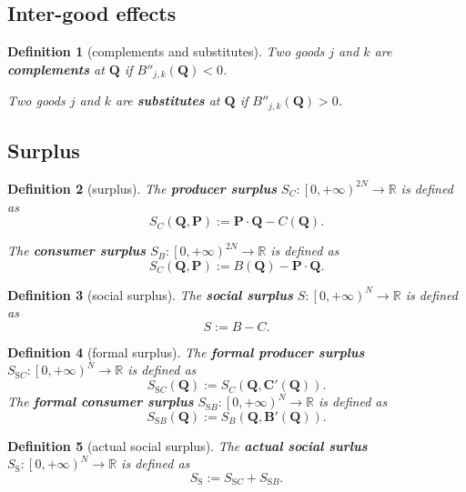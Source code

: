 \documentclass{article}
\newtheorem{definition}{Definition}[subsection]
\begin{document}
\subsection{Inter-good effects}

\begin{definition}[complements and substitutes]
Two goods $j$ and $k$ are \textbf{complements} at $\mathbf Q$ if $B''_{j,k}\left(\mathbf Q\right)<0$.

Two goods $j$ and $k$ are \textbf{substitutes} at $\mathbf Q$ if $B''_{j,k}\left(\mathbf Q\right)>0$.
\end{definition}

\subsection{Surplus}

\begin{definition}[surplus]
\label{multi surplus}
The \textbf{producer surplus} $S_C:\left[0,+\infty\right)^{2N}\to\mathbb R$ is defined as
$$S_C\left(\mathbf Q,\mathbf P\right):=\mathbf P\cdot\mathbf Q-C\left(\mathbf Q\right).$$

The \textbf{consumer surplus} $S_B:\left[0,+\infty\right)^{2N}\to\mathbb R$ is defined as
$$S_C\left(\mathbf Q,\mathbf P\right):=B\left(\mathbf Q\right)-\mathbf P\cdot\mathbf Q.$$
\end{definition}

\begin{definition}[social surplus]
\label{multi social surplus}
The \textbf{social surplus} $S:\left[0,+\infty\right)^N\to\mathbb R$ is defined as
$$S:=B-C.$$
\end{definition}

\begin{definition}[formal surplus]
\label{multi formal surplus}
The \textbf{formal producer surplus} $S_{\mathrm SC}:\left[0,+\infty\right)^N\to\mathbb R$ is defined as
$$S_{\mathrm SC}\left(\mathbf Q\right):=S_C\left(\mathbf Q,\mathbf C'\left(\mathbf Q\right)\right).$$
The \textbf{formal consumer surplus} $S_{\mathrm SB}:\left[0,+\infty\right)^N\to\mathbb R$ is defined as
$$S_{\mathrm SB}\left(\mathbf Q\right):=S_B\left(\mathbf Q,\mathbf B'\left(\mathbf Q\right)\right).$$
\end{definition}

\begin{definition}[actual social surplus]
\label{multi actual social surplus}
The \textbf{actual social surlus} $S_\mathrm S:\left[0,+\infty\right)^N\to\mathbb R$ is defined as
$$S_\mathrm S:=S_{\mathrm SC}+S_{\mathrm SB}.$$
\end{definition}
\end{document}
